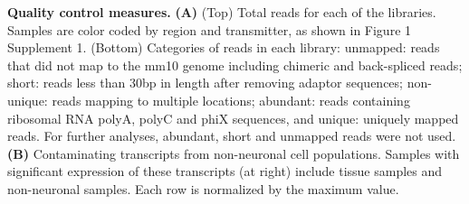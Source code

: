 \textbf{Quality control measures.} \textbf{(A)} (Top) Total reads for each of the libraries. Samples are color coded by region and transmitter, as shown in Figure 1 Supplement 1. (Bottom) Categories of reads in each library: unmapped: reads that did not map to the mm10 genome including chimeric and back-spliced reads; short: reads less than 30bp in length after removing adaptor sequences; non-unique: reads mapping to multiple locations; abundant: reads containing ribosomal RNA polyA, polyC and phiX sequences, and unique: uniquely mapped reads. For further analyses, abundant, short and unmapped reads were not used.
\textbf{(B)} Contaminating transcripts from non-neuronal cell populations. Samples with significant expression of these transcripts (at right) include tissue samples and non-neuronal samples. Each row is normalized by the maximum value. 
